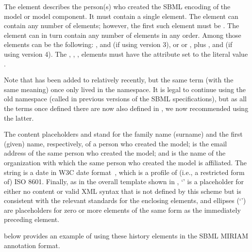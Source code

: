 The  element describes the person(s) who created
the SBML encoding of the model or model component.  It must
contain a single  element.  The 
element can contain any number of elements; however, the first
such element must be .  The  element
can in turn contain any number of elements in any order.  Among
those elements can be the following: ,
 and  (if using  version 3), or  or , plus , and  (if using  version 4).
The , , ,   
elements
must have the attribute  set to the literal
value .

\begin{blockChanged}
Note that  has been added to  relatively recently, but the same term (with the same meaning) once only lived in the  namespace.  It is legal to continue using the old namespace (called  in previous versions of the SBML specifications), but as all the terms once defined there are now also defined in , we now recommended using the latter.
\end{blockChanged}

The content placeholders \familyName and \givenName stand for the
family name (surname) and the first (given) name, respectively, of
a person who created the model;   \emailAddress is the email address
of the same person who created the model; and \orgName is the name
of the organization with which the same person who created the
model is affiliated.  The string \historyDate is a date in W3C
date format~\citep{wolf:1998}, which is a profile of (i.e., a
restricted form of) ISO 8601.  Finally, as in the overall template
shown in , `\otherContent' is
a placeholder for either no content or valid XML syntax that is
not defined by this scheme but is consistent with the relevant
standards for the enclosing elements, and ellipses
(`\moreOfTheSame') are placeholders for zero or more elements of
the same form as the immediately preceding element.

 below provides an example of
using these history elements in the SBML MIRIAM annotation format.


